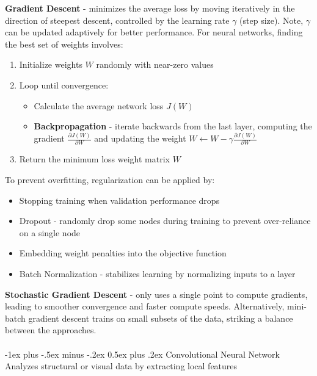 \documentclass[10pt,landscape]{article}
\makeatletter
\renewcommand{\section}{\@startsection{section}{1}{0mm}%
                                {-1ex plus -.5ex minus -.2ex}%
                                {0.5ex plus .2ex}%
                                {\normalfont\large\bfseries}}
\makeatother
\begin{document}
\begin{multicols}{3}
\smallskip
\textbf{Gradient Descent} - minimizes the average loss by moving iteratively in the direction of steepest descent, controlled by the learning rate $\gamma$ (step size). Note, $\gamma$ can be updated adaptively for better performance. For neural networks, finding the best set of weights involves:
\begin{enumerate}[leftmargin=5mm]
\itemsep -.4mm
\item Initialize weights $W$ randomly with near-zero values
\item Loop until convergence:
    \begin{itemize}[label={--},leftmargin=4mm]
    \itemsep -.4mm
    \item Calculate the average network loss $J(W)$
    \item \textbf{Backpropagation} - iterate backwards from the last layer, computing the gradient $\frac{\partial J(W)}{\partial W}$ and updating the weight $W \leftarrow W - \gamma \frac{\partial J(W)}{\partial W}$
    \end{itemize}
\item Return the minimum loss weight matrix $W$
\end{enumerate}

To prevent overfitting, regularization can be applied by:
\begin{itemize}[label={--},leftmargin=4mm]
\itemsep -.4mm
\item Stopping training when validation performance drops
\item Dropout - randomly drop some nodes during training to prevent over-reliance on a single node
\item Embedding weight penalties into the objective function
\item Batch Normalization - stabilizes learning by normalizing inputs to a layer
\end{itemize}
\textbf{Stochastic Gradient Descent} - only uses a single point to compute gradients, leading to smoother convergence and faster compute speeds. Alternatively, mini-batch gradient descent trains on small subsets of the data, striking a balance between the approaches.
\\

\columnbreak
\textcolor{white}{.}\vspace{-5mm}\\ %
\section{Convolutional Neural Network}
Analyzes structural or visual data by extracting local features


\end{multicols}
\end{document}
